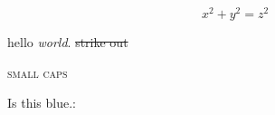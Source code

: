\documentclass{article}
\begin{document}
$$
x^2 + y^2 = z^2
$$
%


hello \emph{world}.
\sout{strike out}

\textsc{small caps}

\color{blue}   Is this blue.:   

\end{document}

